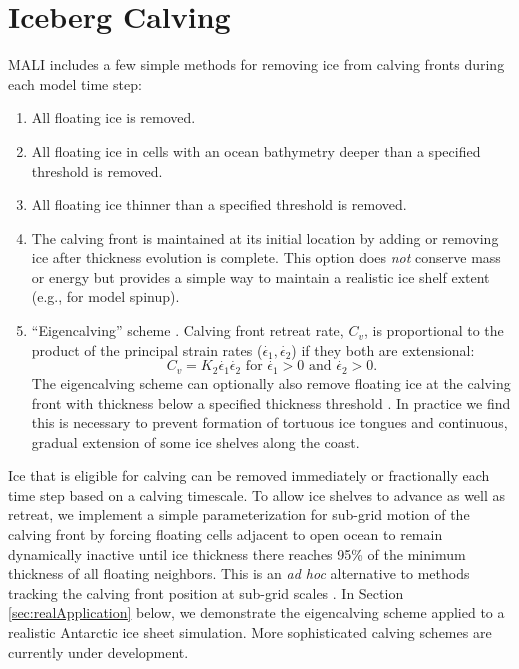 \section{Iceberg Calving}
\label{sec:calving}
MALI includes a few simple methods for removing ice from calving fronts during each model time step:
\begin{enumerate}
\item All floating ice is removed.
\item All floating ice in cells with an ocean bathymetry deeper than a specified threshold is removed.
\item All floating ice thinner than a specified threshold is removed.
\item The calving front is maintained at its initial location by adding or removing ice after thickness evolution is complete. This option does \textit{not} conserve mass or energy but provides a simple way to maintain a realistic ice shelf extent (e.g., for model spinup).
\item ``Eigencalving'' scheme \citep{Levermann2012}.  Calving front retreat rate, $C_v$, is proportional to the product of the principal strain rates ($\dot{\epsilon_1}, \dot{\epsilon_2}$) if they both are extensional:
\begin{equation}
  C_v = K_2 \dot{\epsilon_1} \dot{\epsilon_2} \text{  for  } \dot{\epsilon_1} > 0 \text{  and  }   \dot{\epsilon_2} > 0.
\label{eigencalving}
\end{equation}
The eigencalving scheme can optionally also remove floating ice at the calving front with thickness below a specified thickness threshold \citep{Feldmann2015}.
In practice we find this is necessary to prevent formation of tortuous ice tongues and continuous, gradual extension of some ice shelves along the coast.
\end{enumerate}
Ice that is eligible for calving can be removed immediately or fractionally each time step
based on a calving timescale. 
To allow ice shelves to advance as well as retreat, we implement a simple parameterization for sub-grid motion of the calving front by forcing floating cells adjacent to open ocean to remain dynamically inactive until ice thickness there reaches 95\% of the minimum thickness of all floating neighbors.
This is an \textit{ad hoc} alternative to methods tracking the calving front position at sub-grid scales \citep{Albrecht2011,Bondzio2016}.
In Section \ref{sec:realApplication} below, we demonstrate the eigencalving scheme applied to a realistic Antarctic ice sheet simulation. 
More sophisticated calving schemes are currently under development.
